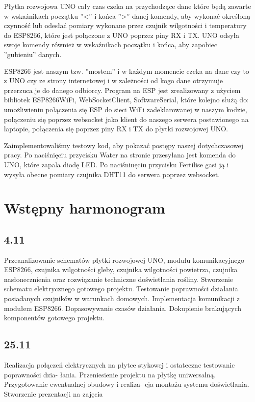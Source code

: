 \documentclass[12pt]{article}
\begin{document}
Płytka rozwojowa UNO cały czas czeka na przychodzące dane które będą zawarte w wskaźnikach początku ''<'' i końca ''>'' danej komendy, aby wykonać określoną czynność lub odesłać pomiary wykonane przez czujnik wilgotności i temperatury do ESP8266, które jest połączone z UNO poprzez piny RX i TX. UNO odsyła swoje komendy również w wskaźnikach początku i końca, aby zapobiec ''gubieniu'' danych.

ESP8266 jest naszym tzw. ''mostem'' i w każdym momencie czeka na dane czy to z UNO czy ze strony internetowej i w zależności od kogo dane otrzymuje przerzuca je do danego odbiorcy.
Program na ESP jest zrealizowany z użyciem bibliotek ESP8266WiFi, WebSocketClient, SoftwareSerial, które kolejno służą do: umożliwieniu połączenia się ESP do sieci WiFi zadeklarowanej w naszym kodzie, połączeniu się poprzez websocket jako klient do naszego serwera postawionego na laptopie, połączenia się poprzez piny RX i TX do płytki rozwojowej UNO.

Zaimplementowaliśmy testowy kod, aby pokazać postępy naszej dotychczasowej pracy. Po naciśnięciu przycisku Water na stronie przesyłana jest komenda do UNO, które zapala diodę LED. Po naciśniuęciu przycisku Fertilise gasi ją i wysyła obecne pomiary czujnika DHT11 do serwera poprzez websocket.



\section{Wstępny harmonogram}
\subsection{4.11}
Przeanalizowanie schematów płytki rozwojowej UNO, modułu komunikacyjnego ESP8266, czujnika wilgotności gleby, czujnika wilgotności powietrza, czujnika nasłonecznienia oraz rozwiązanie techniczne doświetlania rośliny. Stworzenie schematu elektrycznego gotowego projektu. Testowanie poprawności działania posiadanych czujników w warunkach domowych. Implementacja komunikacji z modułem ESP8266. Dopasowywanie czasów działania. 
Dokupienie brakujących komponentów gotowego projektu. 
\subsection{25.11}
Realizacja połączeń elektrycznych na płytce stykowej i ostateczne testowanie poprawności dzia-
łania. Przeniesienie projektu na płytkę uniwersalną. Przygotowanie ewentualnej obudowy i realiza-
cja montażu systemu doświetlania. Stworzenie prezentacji na zajęcia
\end{document}
